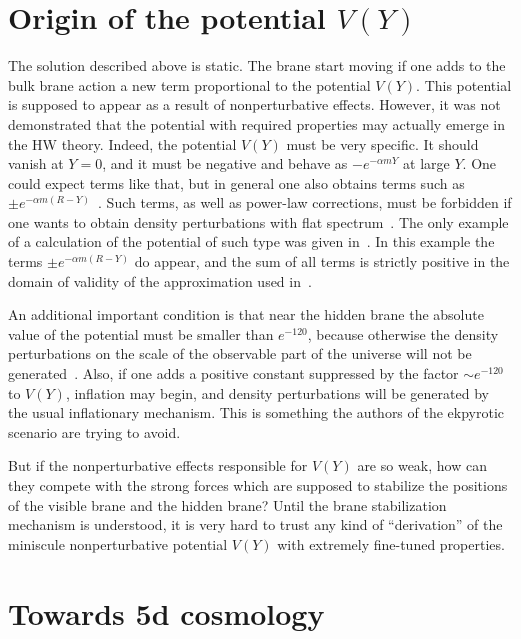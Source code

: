 \documentclass[a4paper,12pt]{article}
\begin{document}
\section{Origin of the potential $V(Y)$}

The solution described above is static. The brane start moving if  one adds to the bulk brane action a new term proportional to the potential $V(Y)$. This potential is supposed to appear as a result of nonperturbative effects. However, it was not demonstrated that the potential with required properties may actually emerge in the HW theory. Indeed, the potential $V(Y)$ must be very specific. It should vanish at $Y=0$, and it must be negative and behave as $- e^{-\alpha m Y}$ at large $Y$. One could expect terms like that, but in general one also obtains terms such as $\pm  e^{-\alpha m (R-Y)}$~\cite{Moore:2000fs}. Such terms, as well as power-law corrections, must be forbidden if one wants to obtain density perturbations with flat spectrum~\cite{KKL}. The only example of a calculation of the potential of such type was given in~\cite{Moore:2000fs}. In this example the terms $\pm  e^{-\alpha m (R-Y)}$ do appear, and the sum of all terms is strictly positive in the domain of validity of the approximation used in~\cite{Moore:2000fs}.

An additional important condition is that near the hidden brane the absolute value of the potential must be smaller than $e^{-120}$, because otherwise the density perturbations on the scale of the observable part of the universe will not be generated~\cite{KKL}. Also, if one adds a positive constant suppressed by the factor $\sim e^{-120}$ to $V(Y)$, inflation may begin, and density perturbations will be generated by the usual inflationary mechanism. This is something the authors of the ekpyrotic scenario are trying to avoid.

But if the nonperturbative effects responsible for $V(Y)$ are so weak, how can they compete with the strong forces which are supposed to stabilize the positions of the visible brane and the hidden brane? Until the brane stabilization mechanism is understood, it is very hard to trust any kind of ``derivation'' of the miniscule nonperturbative potential $V(Y)$ with extremely fine-tuned properties.


  
  
\section{Towards 5d cosmology}
\end{document}
